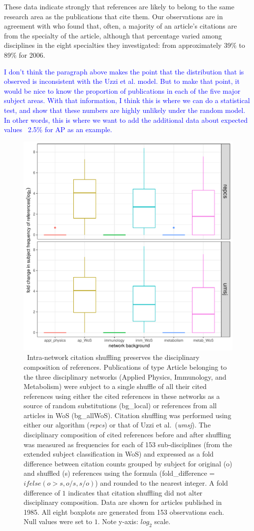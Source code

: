 \documentclass[NETN]{stjour}
\begin{document}
These data indicate strongly that references are likely to belong to the same research area as the publications that cite them. Our observations are in agreement with \cite{wallace_lariviere_gingras_2012} who found that, often, a majority of an article's citations are from the specialty of the article, although that percentage varied among disciplines in the eight specialties they investigated: from approximately 39\% to 89\% for 2006. 

\textcolor{blue}{I don't think the paragraph above makes the point that the distribution that is observed is inconsistent with the Uzzi et al. model. But to make that point, it would be nice to know the proportion of publications in each of the five major subject areas. With that information,  I think this is where we can do a statistical test, and show that these numbers are highly unlikely under the random model.
In other words, this is where we want to add the additional data about expected values ~2.5\% for AP as an example.} 


\begin{figure}%
\centering
\includegraphics[width=0.6\linewidth]{background-effect}     
\caption{\ Intra-network citation shuffling preserves the disciplinary composition of references. Publications of type Article belonging to the three disciplinary networks (Applied Physics, Immunology, and  Metabolism) were subject to a single shuffle of all their cited references using either the cited references in these networks as a source of random substitutions (bg\_local) or references from all articles in WoS (bg\_allWoS). Citation shuffling was performed using either our algorithm (\emph{repcs})
 or that of Uzzi et al.~(\emph{umsj}). The disciplinary composition of cited references before and after shuffling was measured as frequencies for each of 153 sub-disciplines (from the extended subject classification in WoS) and expressed as a fold difference between citation counts grouped by subject for original (o) and shuffled (s) references using the formula (fold\_difference = $ifelse(o > s, o/s, s/o)$) and rounded to the nearest integer. A fold difference of $1$ indicates that citation shuffling did not alter disciplinary composition. Data are shown for articles published in 1985. All eight boxplots are generated from 153 observations each. Null values were set to $1$. Note y-axis: $log_2$ scale.} 
\label{fig:be}
\end{figure}
\end{document}
